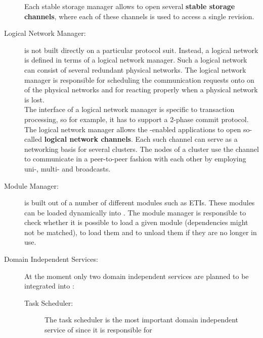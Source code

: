 \documentclass[a4paper, 10pt]{book}
\begin{document}
\begin{description}
                        Each stable storage manager allows to open several \textbf{stable
                        storage channels}, where each of these channels is used to access
                        a single revision.
                    \item [Logical Network Manager:] \SYNEIGHT is not built directly on a
                        particular protocol suit. Instead, a logical network is defined in
                        terms of a logical network manager. Such a logical network can 
                        consist of several redundant physical networks. The logical network
                        manager is responsible for scheduling the communication requests
                        onto on of the physical networks and for reacting properly when a
                        physical network is lost.\\
                        The interface of a logical network manager is specific to
                        transaction processing, so for example, it has to support a 2-phase
                        commit protocol.\\
                        The logical network manager allows the \SYNEIGHT-enabled applications to
                        open so-called \textbf{logical network channels}. Each such channel
                        can serve as a networking basis for several clusters. The nodes
                        of a cluster use the channel to communicate in a peer-to-peer
                        fashion with each other by employing uni-, multi- and broadcasts.
                    \item[Module Manager:] \SYNEIGHT is built out of a number of different
                        modules such as ETIs. These modules can be loaded dynamically into
                        \SYNEIGHT. The module manager is responsible to check whether it is
                        possible to load a given module (dependencies might not be matched),
                        to load them and to unload them if they are no longer in use. 
                    \item[Domain Independent Services:] At the moment only two domain
                        independent services are planned to be integrated into \SYNEIGHT:
                        \begin{description}
                            \item[Task Scheduler:] The task scheduler is the most important
                                domain independent service of \SYNEIGHT since it is responsible for

\end{description}
\end{description}
\end{document}
